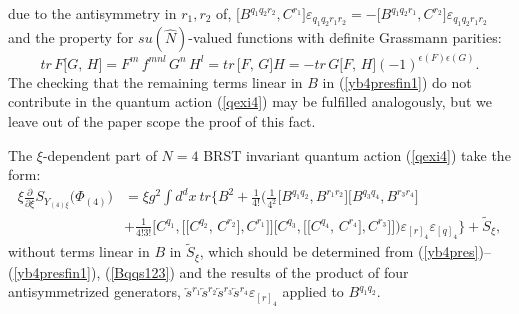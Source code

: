 \documentclass[10pt]{article}
\begin{document}
due to the antisymmetry in  $r_1,r_2$ of, $ \big[B^{q_1q_2r_2},C^{r_1}\big]\varepsilon_{q_1q_2r_1r_2} = -\big[B^{q_1q_2r_1},C^{r_2}\big]\varepsilon_{q_1q_2r_1r_2}$ and the property for $su(\hat{N})$-valued functions with definite Grassmann parities:
\begin{equation}\label{suNtr}
  tr \,  F \big[G,\,H\big] = F^m\,  f^{mnl}\, G^n\,H^l  =  tr \,   \big[F,\,G\big]H =  -  tr \,   G \big[F,\,H\big](-1)^{\epsilon(F)\epsilon(G)}.
\end{equation}
The checking that the remaining  terms linear in $B$ in (\ref{yb4presfin1}) do not contribute in the quantum action (\ref{qexi4})  may be fulfilled analogously, but we leave out of the paper scope the proof of this  fact.

 The   $\xi$-dependent  part of  $N=4$ BRST invariant  quantum action  (\ref{qexi4})  take the form:
\begin{align}
  \xi\frac{\partial}{\partial\xi} S_{Y_{(4)\xi}}\big({\Phi}_{(4)}\big) &  =  {\xi g^2} \int d^{d}x\ tr \Bigg\{  B^2+\frac{1}{4!}\Big(\frac{1}{4^2}\big[B^{q_1q_2}, B^{r_1r_2}\big]
\big[B^{q_3q_4}, B^{r_3r_4}\big]  \label{addxi4app} \\
 \phantom{ S_{add(4)}} &   + \frac{1}{4!3!}\big[C^{q_1},\big[\big[C^{q_2},\,C^{r_2}\big] , C^{r_1}\big]\big]  \big[C^{q_3},\big[\big[C^{q_4},\,C^{r_4}\big] , C^{r_3}\big]\big]\Big)\varepsilon_{[r]_4}\varepsilon_{[q]_4} \Bigg\}+ \widetilde{S}_\xi , \nonumber
\end{align}
without terms linear in $B$ in $\widetilde{S}_\xi$, which should be determined from (\ref{yb4pres})--(\ref{yb4presfin1}), (\ref{Bqqs123}) and the  results of the product of four antisymmetrized generators, $\overleftarrow{s}{}^{r_1}\overleftarrow{s}{}^{r_2}\overleftarrow{s}{}^{r_3}\overleftarrow{s}{}^{r_4}\varepsilon_{[r]_4}$ applied to $B^{q_1q_2}$.
\end{document}
